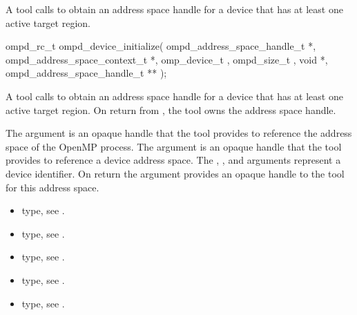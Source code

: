 \label{subsubsubsec:ompd_device_initialize}

\summary
A tool calls  to obtain an address space 
handle for a device that has at least one  active target region.

\format
\begin{cspecific}
\begin{ompSyntax}
ompd_rc_t ompd_device_initialize(
  ompd_address_space_handle_t *,
  ompd_address_space_context_t *,
  omp_device_t ,
  ompd_size_t ,
  void *,
  ompd_address_space_handle_t **
);
\end{ompSyntax}
\end{cspecific}

\descr
A tool calls  to obtain an address space 
handle for a device that has at least one  active target region. On return 
from , the tool owns the address space handle.

\argdesc
The  argument is an opaque handle that the tool provides
to reference the address space of the OpenMP process. The  
argument is an opaque handle that the tool provides to reference a device 
address space. The , , and  arguments represent 
a device identifier. On return the  argument provides an 
opaque handle to the tool for this address space.

\crossreferences
\begin{itemize}
\item {} type, see .

\item {} type, see .

\item {} type, 
see .

\item {} type, 
see .

\item {} type, see .
\end{itemize}



